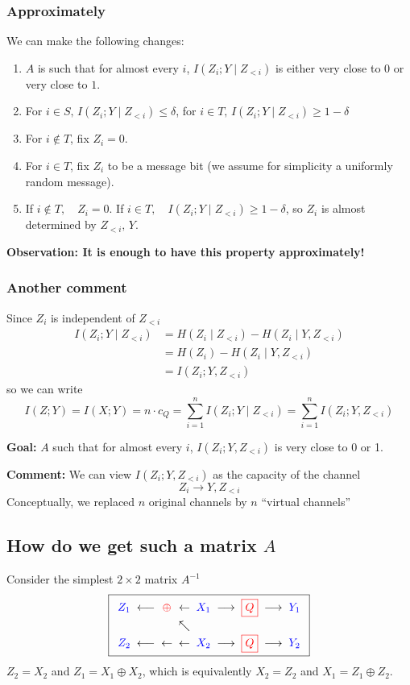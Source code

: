 \documentclass{article}
\begin{document}
\subsubsection{Approximately}
We can make the following changes:
\begin{enumerate}
    \item $A$ is such that for almost every $i$, $I(Z_i; Y \mid Z_{<i})$ is either very close to $0$ or very close to $1$.
    \item For $i\in S, \, I(Z_i; Y \mid Z_{<i})\leq \delta$, for $i\in T,\, I(Z_i; Y \mid Z_{<i})\geq 1-\delta$
    \item For $i\notin T$, fix $Z_i = 0$.
    \item For $i\in T$, fix $Z_i$ to be a message bit (we assume for simplicity a uniformly random message).
    \item If $i\notin T,\quad Z_i=0$. If $i\in T,\quad I(Z_i; Y\mid Z_{< i})\geq 1-\delta$, so $Z_i$ is almost determined by $Z_{<i},\, Y$.
\end{enumerate}

\textbf{Observation: It is enough to have this property approximately!}

\subsubsection{Another comment}
Since $Z_i$ is independent of $Z_{<i}$
\begin{align*}
    I(Z_i; Y\mid Z_{<i}) &= H(Z_i\mid Z_{<i}) - H(Z_i\mid Y, Z_{<i})\\
    &= H(Z_i) - H(Z_i\mid Y, Z_{< i})\\
    &= I(Z_i; Y, Z_{<i})
\end{align*}
so we can write 
\[
I(Z;Y) = I(X;Y) = n\cdot c_Q = \sum_{i=1 }^{n }I(Z_i; Y \mid Z_{<i}) = \sum_{i=1 }^{n }I(Z_i; Y, Z_{<i})
\]

\textbf{Goal:} $A$ such that for almost every $i$, $I(Z_i; Y, Z_{<i})$ is very close to 0 or 1.

\textbf{Comment:} We can view $I(Z_i; Y, Z_{<i})$ as the capacity of the channel 
\[
Z_i \to Y, Z_{<i}
\]
Conceptually, we replaced $n$ original channels by $n$ ``virtual channels''

\subsection{How do we get such a matrix $A$}
Consider the simplest $2\times 2$ matrix $A^{-1}$
\[
\boxed{
\renewcommand{\arraystretch}{1.3}
\begin{array}{c@{\;\;}c@{\;\;}c@{\;\;}c@{\;\;}c@{\;\;}c@{\;\;}c@{\;\;}c@{\;\;}c}
{\color{blue}Z_1} & \longleftarrow & {\color{red}\oplus} & \leftarrow & {\color{blue}X_1} & \longrightarrow & {\color{red}\boxed{Q}} & \longrightarrow & {\color{blue}Y_1} \\
 & & & \nwarrow & & & & & \\
{\color{blue}Z_2} & \longleftarrow & \leftarrow & \leftarrow & {\color{blue}X_2} & \longrightarrow & {\color{red}\boxed{Q}} & \longrightarrow & {\color{blue}Y_2}
\end{array}
}
\]
$Z_2= X_2$ and $Z_1=X_1\oplus X_2$, which is equivalently $X_2= Z_2$ and $X_1 = Z_1 \oplus Z_2$.
\end{document}
